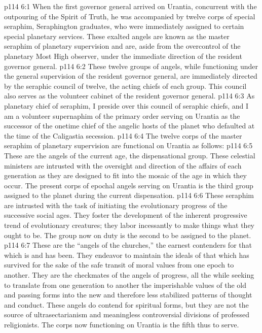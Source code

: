 \vs p114 6:1 When the first governor general arrived on Urantia, concurrent with the outpouring of the Spirit of Truth, he was accompanied by twelve corps of special seraphim, Seraphington graduates, who were immediately assigned to certain special planetary services. These exalted angels are known as the master seraphim of planetary supervision and are, aside from the overcontrol of the planetary Most High observer, under the immediate direction of the resident governor general.
\vs p114 6:2 These twelve groups of angels, while functioning under the general supervision of the resident governor general, are immediately directed by the seraphic council of twelve, the acting chiefs of each group. This council also serves as the volunteer cabinet of the resident governor general.
\vs p114 6:3 As planetary chief of seraphim, I preside over this council of seraphic chiefs, and I am a volunteer supernaphim of the primary order serving on Urantia as the successor of the onetime chief of the angelic hosts of the planet who defaulted at the time of the Caligastia secession.
\vs p114 6:4 The twelve corps of the master seraphim of planetary supervision are functional on Urantia as follows:
\pc \vs p114 6:5 \bibnobreakspace {} These are the angels of the current age, the dispensational group. These celestial ministers are intrusted with the oversight and direction of the affairs of each generation as they are designed to fit into the mosaic of the age in which they occur. The present corps of epochal angels serving on Urantia is the third group assigned to the planet during the current dispensation.
\pc \vs p114 6:6 \bibnobreakspace {} These seraphim are intrusted with the task of initiating the evolutionary progress of the successive social ages. They foster the development of the inherent progressive trend of evolutionary creatures; they labor incessantly to make things what they ought to be. The group now on duty is the second to be assigned to the planet.
\pc \vs p114 6:7 \bibnobreakspace {} These are the “angels of the churches,” the earnest contenders for that which is and has been. They endeavor to maintain the ideals of that which has survived for the sake of the safe transit of moral values from one epoch to another. They are the checkmates of the angels of progress, all the while seeking to translate from one generation to another the imperishable values of the old and passing forms into the new and therefore less stabilized patterns of thought and conduct. These angels do contend for spiritual forms, but they are not the source of ultrasectarianism and meaningless controversial divisions of professed religionists. The corps now functioning on Urantia is the fifth thus to serve.
